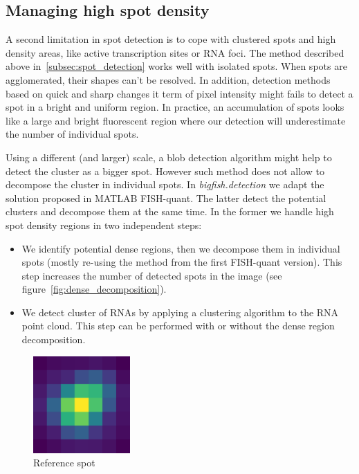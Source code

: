 \subsection{Managing high spot density} \label{subsec:dense_decomposition}

A second limitation in spot detection is to cope with clustered spots and high density areas, like active transcription sites or \ac{RNA} foci.
The method described above in~\ref{subsec:spot_detection} works well with isolated spots.
When spots are agglomerated, their shapes can't be resolved.
In addition, detection methods based on quick and sharp changes it term of pixel intensity might fails to detect a spot in a bright and uniform region.
In practice, an accumulation of spots looks like a large and bright fluorescent region where our detection will underestimate the number of individual spots.

Using a different (and larger) scale, a blob detection algorithm\cite{walt_scikit-image_2014} might help to detect the cluster as a bigger spot.
However such method does not allow to decompose the cluster in individual spots.
In \emph{bigfish.detection} we adapt the solution proposed in MATLAB FISH-quant\cite{mueller_fish-quant_2013}.
The latter detect the potential clusters and decompose them at the same time.
In the former we handle high spot density regions in two independent steps:

\begin{itemize}
	\item We identify potential dense regions, then we decompose them in individual spots (mostly re-using the method from the first FISH-quant version).
	This step increases the number of detected spots in the image (see figure~\ref{fig:dense_decomposition}).
	\item We detect cluster of \ac{RNA}s by applying a clustering algorithm to the \ac{RNA} point cloud.
	This step can be performed with or without the dense region decomposition.
\end{itemize}

\begin{figure}
  \begin{center}
    \includegraphics[width=0.33\textwidth]{figures/chapter2/reference_spot}
  \end{center}
  \caption{Reference spot}
  \label{fig:reference_spot}
\end{figure}

